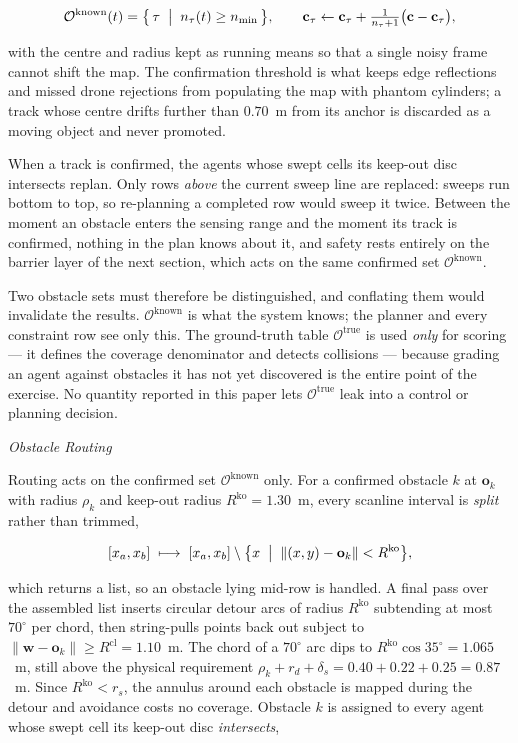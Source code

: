 \documentclass[10pt,letterpaper]{article}
\newcommand{\headingthree}[1]{%
    \par\vspace{6pt}%
    {\centering\fontsize{10}{12}\selectfont\itshape #1\par}%
    \vspace{2pt}\noindent\ignorespaces}
\begin{document}
\begin{equation}
    \mathcal{O}^{\mathrm{known}}(t)=\bigl\{\,\tau \;\bigm|\; n_\tau(t)\ge n_{\min}\,\bigr\},
    \qquad
    \mathbf{c}_\tau \leftarrow \mathbf{c}_\tau+\tfrac{1}{n_\tau+1}\bigl(\mathbf{c}-\mathbf{c}_\tau\bigr),
    \label{eq:percep}
\end{equation}

with the centre and radius kept as running means so that a single noisy frame cannot shift
the map. The confirmation threshold is what keeps edge reflections and missed drone
rejections from populating the map with phantom cylinders; a track whose centre drifts
further than $0.70$~m from its anchor is discarded as a moving object and never promoted.

When a track is confirmed, the agents whose swept cells its keep-out disc intersects
replan. Only rows \emph{above} the current sweep line are replaced: sweeps run bottom to
top, so re-planning a completed row would sweep it twice. Between the moment an obstacle
enters the sensing range and the moment its track is confirmed, nothing in the plan knows
about it, and safety rests entirely on the barrier layer of the next section, which acts on
the same confirmed set $\mathcal{O}^{\mathrm{known}}$.

Two obstacle sets must therefore be distinguished, and conflating them would invalidate the
results. $\mathcal{O}^{\mathrm{known}}$ is what the system knows; the planner and every
constraint row see only this. The ground-truth table $\mathcal{O}^{\mathrm{true}}$ is used
\emph{only} for scoring --- it defines the coverage denominator and detects collisions ---
because grading an agent against obstacles it has not yet discovered is the entire point of
the exercise. No quantity reported in this paper lets $\mathcal{O}^{\mathrm{true}}$ leak
into a control or planning decision.

\headingthree{Obstacle Routing}

Routing acts on the confirmed set $\mathcal{O}^{\mathrm{known}}$ only. For a confirmed
obstacle $k$ at $\mathbf{o}_k$ with radius $\rho_k$ and keep-out radius
$R^{\mathrm{ko}}=1.30$~m, every scanline interval is \emph{split} rather than trimmed,

\begin{equation}
    \label{eq:e6}
    [x_a,x_b]\;\longmapsto\;
    [x_a,x_b]\setminus\bigl\{x \;\bigm|\; \|(x,y)-\mathbf{o}_k\|<R^{\mathrm{ko}}\bigr\},
\end{equation}

which returns a list, so an obstacle lying mid-row is handled. A final pass over the
assembled list inserts circular detour arcs of radius $R^{\mathrm{ko}}$ subtending at most
$70^\circ$ per chord, then string-pulls points back out subject to
$\|\mathbf{w}-\mathbf{o}_k\|\ge R^{\mathrm{cl}}=1.10$~m. The chord of a $70^\circ$ arc dips
to $R^{\mathrm{ko}}\cos 35^\circ=1.065$~m, still above the physical requirement
$\rho_k+r_d+\delta_s=0.40+0.22+0.25=0.87$~m. Since $R^{\mathrm{ko}}<r_s$, the annulus
around each obstacle is mapped during the detour and avoidance costs no coverage. Obstacle
$k$ is assigned to every agent whose swept cell its keep-out disc \emph{intersects},
\end{document}
